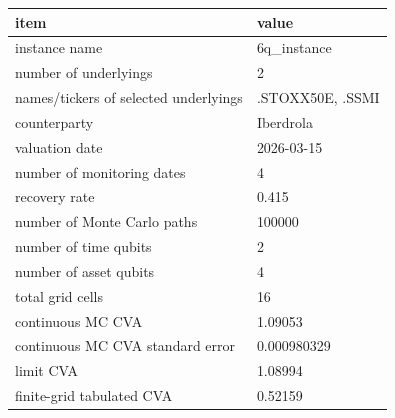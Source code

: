 \begin{tabular}{ll}
\toprule
item & value \\
\midrule
instance name & 6q_instance \\
number of underlyings & 2 \\
names/tickers of selected underlyings & .STOXX50E, .SSMI \\
counterparty & Iberdrola \\
valuation date & 2026-03-15 \\
number of monitoring dates & 4 \\
recovery rate & 0.415 \\
number of Monte Carlo paths & 100000 \\
number of time qubits & 2 \\
number of asset qubits & 4 \\
total grid cells & 16 \\
continuous MC CVA & 1.09053 \\
continuous MC CVA standard error & 0.000980329 \\
limit CVA & 1.08994 \\
finite-grid tabulated CVA & 0.52159 \\
\bottomrule
\end{tabular}
